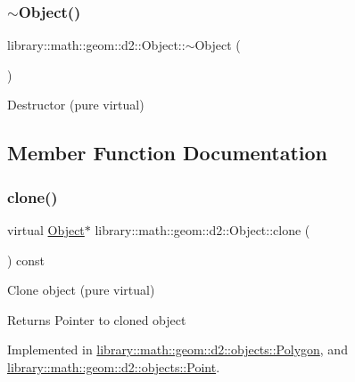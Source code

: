 \subsubsection{\texorpdfstring{$\sim$\+Object()}{~Object()}}
{\footnotesize\ttfamily library\+::math\+::geom\+::d2\+::\+Object\+::$\sim$\+Object (\begin{DoxyParamCaption}{ }\end{DoxyParamCaption})\hspace{0.3cm}{\ttfamily [pure virtual]}}



Destructor (pure virtual) 



\subsection{Member Function Documentation}
\mbox{\label{classlibrary_1_1math_1_1geom_1_1d2_1_1_object_a5c26ae4120edb24f6463d65a9cef247d}} 
\subsubsection{\texorpdfstring{clone()}{clone()}}
{\footnotesize\ttfamily virtual \hyperlink{classlibrary_1_1math_1_1geom_1_1d2_1_1_object}{Object}$\ast$ library\+::math\+::geom\+::d2\+::\+Object\+::clone (\begin{DoxyParamCaption}{ }\end{DoxyParamCaption}) const\hspace{0.3cm}{\ttfamily [pure virtual]}}



Clone object (pure virtual) 

\begin{DoxyReturn}{Returns}
Pointer to cloned object 
\end{DoxyReturn}


Implemented in \hyperlink{classlibrary_1_1math_1_1geom_1_1d2_1_1objects_1_1_polygon_a15bbbe7e468a50d6059e2df946175e1c}{library\+::math\+::geom\+::d2\+::objects\+::\+Polygon}, and \hyperlink{classlibrary_1_1math_1_1geom_1_1d2_1_1objects_1_1_point_aa6b55bdbf5a0ce9ec8bc91ca79de3569}{library\+::math\+::geom\+::d2\+::objects\+::\+Point}.

